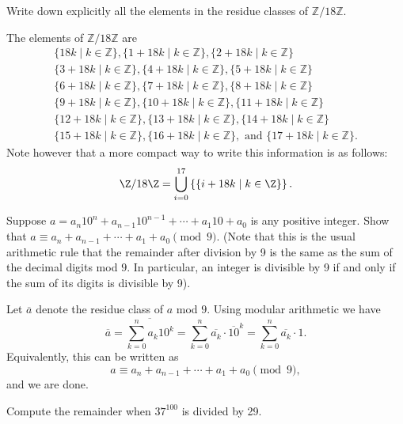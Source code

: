\begin{questions}
\question
    Write down explicitly all the elements in the residue classes of \(\mathbb{Z} / 18 \mathbb{Z}\).
\begin{solution} The elements of \(\mathbb{Z} / 18 \mathbb{Z}\) are 
    $$\begin{gathered}
        \{18 k \mid k \in \mathbb{Z}\},\{1+18 k \mid k \in \mathbb{Z}\},\{2+18 k \mid k \in \mathbb{Z}\} \\
        \{3+18 k \mid k \in \mathbb{Z}\},\{4+18 k \mid k \in \mathbb{Z}\},\{5+18 k \mid k \in \mathbb{Z}\} \\
        \{6+18 k \mid k \in \mathbb{Z}\},\{7+18 k \mid k \in \mathbb{Z}\},\{8+18 k \mid k \in \mathbb{Z}\} \\
        \{9+18 k \mid k \in \mathbb{Z}\},\{10+18 k \mid k \in \mathbb{Z}\},\{11+18 k \mid k \in \mathbb{Z}\} \\
        \{12+18 k \mid k \in \mathbb{Z}\},\{13+18 k \mid k \in \mathbb{Z}\},\{14+18 k \mid k \in \mathbb{Z}\} \\
        \{15+18 k \mid k \in \mathbb{Z}\},\{16+18 k \mid k \in \mathbb{Z}\},\text{ and }\{17+18 k \mid k \in \mathbb{Z}\}.
        \end{gathered}$$
    Note however that a more compact way to write this information is as follows: \[
        \Z/18\Z = \bigcup_{i=0}^{17} \left\{ \{i+18k \mid k\in \Z\} \right\}.
    \]
\end{solution}

\question
    Suppose \(a=a_n 10^n+a_{n-1} 10^{n-1}+\cdots+a_1 10+a_0\) is any positive integer. Show  that \(a \equiv a_n+a_{n-1}+\cdots+a_1+a_0\pmod 9\). (Note that this is the usual arithmetic rule that the remainder after division by 9 is the same as the sum of the decimal digits mod \(9\). In particular, an integer is divisible by 9 if and only if the sum of its digits is divisible by 9).
\begin{theproof}
    Let \(\overline{a}\) denote the residue class of \(a\) mod \(9\). Using modular arithmetic we have 
    \[
        \overline{a}=\overline{\sum_{k=0}^n a_{k} 10^k}=\sum_{k=0}^n{\overline{a_k}}\cdot \overline{10}^k=\sum_{k=0}^n \overline{a_k} \cdot 1.
    \] 
    Equivalently, this can be written as 
    \[a \equiv a_n+a_{n-1}+\cdots+a_1+a_0\pmod 9,\]
    and we are done.
\end{theproof}

\question
    Compute the remainder when \(37^{100}\) is divided by 29.


\end{questions}
